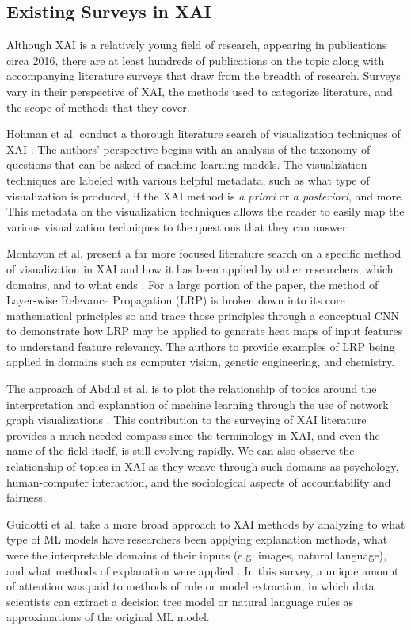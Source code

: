 \subsection{Existing Surveys in XAI}

Although XAI is a relatively young field of research, appearing in publications circa 2016, there are at least hundreds of publications on the topic along with accompanying literature surveys that draw from the breadth of research.  Surveys vary in their perspective of XAI, the methods used to categorize literature, and the scope of methods that they cover.

Hohman et al. conduct a thorough literature search of visualization techniques of XAI \cite{Hohman2018}.  The authors' perspective begins with an analysis of the taxonomy of questions that can be asked of machine learning models.  The visualization techniques are labeled with various helpful metadata, such as what type of visualization is produced, if the XAI method is \textit{a priori} or \textit{a posteriori}, and more.  This metadata on the visualization techniques allows the reader to easily map the various visualization techniques to the questions that they can answer.

Montavon et al. present a far more focused literature search on a specific method of visualization in XAI and how it has been applied by other researchers, which domains, and to what ends \cite{MONTAVON20181}.  For a large portion of the paper, the method of Layer-wise Relevance Propagation (LRP) is broken down into its core mathematical principles so and trace those principles through a conceptual CNN to demonstrate how LRP may be applied to generate heat maps of input features to understand feature relevancy.  The authors to provide examples of LRP being applied in domains such as computer vision, genetic engineering, and chemistry.

The approach of Abdul et al. is to plot the relationship of topics around the interpretation and explanation of machine learning through the use of network graph visualizations \cite{Abdul:2018:TTE:3173574.3174156}.  This contribution to the surveying of XAI literature provides a much needed compass since the terminology in XAI, and even the name of the field itself, is still evolving rapidly.  We can also observe the relationship of topics in XAI as they weave through such domains as psychology, human-computer interaction, and the sociological aspects of accountability and fairness.

Guidotti et al. take a more broad approach to XAI methods by analyzing to what type of ML models have researchers been applying explanation methods, what were the interpretable domains of their inputs (e.g. images, natural language), and what methods of explanation were applied \cite{Guidotti:2018:SME:3271482.3236009}.  In this survey, a unique amount of attention was paid to methods of rule or model extraction, in which data scientists can extract a decision tree model or natural language rules as approximations of the original ML model.

